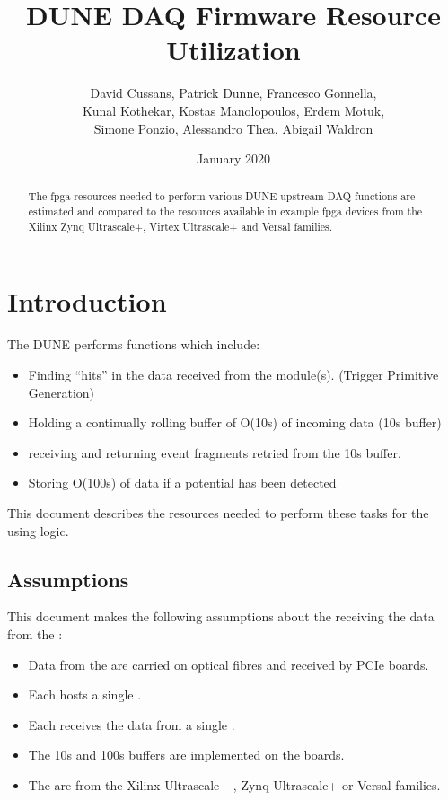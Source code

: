 \documentclass{article}
\title{DUNE DAQ Firmware Resource Utilization}
\author{David Cussans, Patrick Dunne, Francesco Gonnella,\\ Kunal Kothekar, Kostas Manolopoulos, Erdem Motuk,\\ Simone Ponzio, Alessandro Thea, Abigail Waldron}
\date{January 2020}
\begin{document}

\maketitle


\begin{abstract}
    The \gls{fpga} resources needed to perform various DUNE upstream DAQ functions are estimated and compared to the resources available in example \gls{fpga} devices from the Xilinx Zynq Ultrascale+, Virtex Ultrascale+ and Versal families.
\end{abstract}

\section{Introduction}

The DUNE  performs functions which include:

\begin{itemize}
  \item Finding ``hits'' in the data received from the \single module(s). (Trigger Primitive Generation)
  \item Holding a continually rolling buffer of O(10s) of incoming data (10s buffer)
  \item receiving  and returning event fragments retried from the 10s buffer.
  \item Storing O(100s) of data if a potential  has been detected
\end{itemize}

This document describes the resources needed to perform these tasks for the \single {} using  logic.

\subsection{Assumptions}

This document makes the following assumptions about the  receiving the data from the \single {}:

\begin{itemize}
  \item Data from the  are carried on optical fibres and received by  PCIe boards.
  \item Each  hosts a single .
  \item Each  receives the data from a single .
  \item The 10s and 100s buffers are implemented on the  boards.
  \item The  are from the Xilinx Ultrascale+ , Zynq Ultrascale+ or Versal  families.
\end{itemize}
\end{document}
